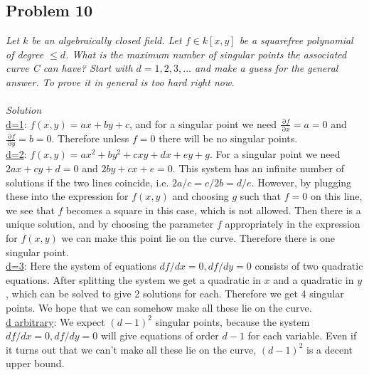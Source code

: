 \documentclass[12 pt]{article}
\DeclareMathOperator {\p} {\partial}
\begin{document}
\subsection*{Problem 10}
\emph{Let $k$ be an algebraically closed field. Let $f \in k[x, y]$ be a squarefree polynomial of degree $\leq d$. What is the maximum number of singular points the associated curve C can have? Start with $d = 1, 2, 3, \dots $ and make a guess for the general answer. To prove it in general is too hard right now.}
\\
\\
\emph{Solution}
\\
\underline{d=1}: $f(x,y) = ax + by + c$, and for a singular point we need $\frac{\p f}{\p x} = a = 0$ and $\frac{\p f}{\p y} = b = 0$. Therefore unless $f = 0$ there will be no singular points.
\\
\underline{d=2}: $f(x,y) = ax^2 + b y^2 + cxy + dx + ey + g$. For a singular point we need $2ax + cy + d = 0$ and $2by + cx + e = 0$. This system has an infinite number of solutions if the two lines coincide, i.e. $2a/c = c/2b = d/e$. However, by plugging these into the expression for $f(x,y)$ and choosing $g$ such that $f = 0$ on this line, we see that $f$ becomes a square in this case, which is not allowed. Then there is a unique solution, and by choosing the parameter $f$ appropriately in the expression for $f(x,y)$ we can make this point lie on the curve. Therefore there is one singular point.
\\
\underline{d=3}: Here the system of equations $df/dx = 0 , df/dy = 0$ consists of two quadratic equations. After splitting the system we get a quadratic in $x$ and a quadratic in $y$, which can be solved to give 2 solutions for each. Therefore we get 4 singular points. We hope that we can somehow make all these lie on the curve.
\\
\underline{d arbitrary}: We expect $(d-1)^2$ singular points, because the system $df/dx = 0 , df/dy = 0$ will give equations of order $d-1$ for each variable. Even if it turns out that we can't make all these lie on the curve, $(d-1)^2$ is a decent upper bound.
\end{document}
